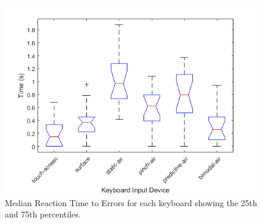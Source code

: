 \begin{figure}[t]
	\centering
	\includegraphics{Figures/fig_reaction_errors_boxplot}
	\caption[Reaction Time to Errors Boxplot]{Median Reaction Time to Errors for each keyboard showing the 25th and 75th percentiles.}
	\label{fig_reaction_errors_boxplot}
\end{figure}

